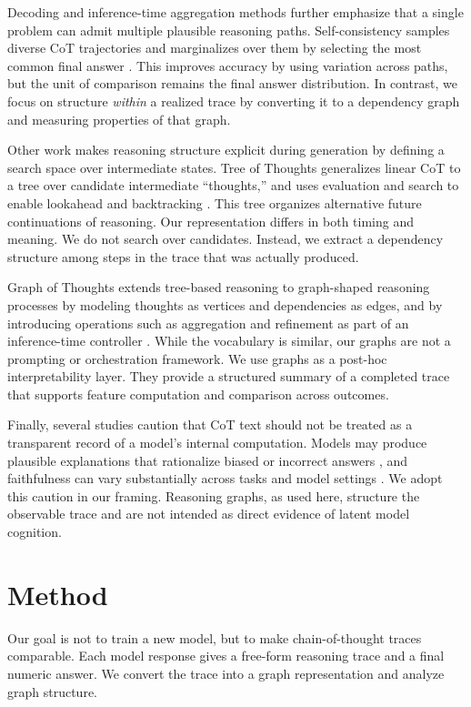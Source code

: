 \documentclass[letterpaper]{article}
\begin{document}
Decoding and inference-time aggregation methods further emphasize that a single problem can admit multiple plausible reasoning paths. Self-consistency samples diverse CoT trajectories and marginalizes over them by selecting the most common final answer \cite{wang2022selfconsistency}. This improves accuracy by using variation across paths, but the unit of comparison remains the final answer distribution. In contrast, we focus on structure \emph{within} a realized trace by converting it to a dependency graph and measuring properties of that graph.

Other work makes reasoning structure explicit during generation by defining a search space over intermediate states. Tree of Thoughts generalizes linear CoT to a tree over candidate intermediate ``thoughts,'' and uses evaluation and search to enable lookahead and backtracking \cite{yao2023tree}. This tree organizes alternative future continuations of reasoning. Our representation differs in both timing and meaning. We do not search over candidates. Instead, we extract a dependency structure among steps in the trace that was actually produced.

Graph of Thoughts extends tree-based reasoning to graph-shaped reasoning processes by modeling thoughts as vertices and dependencies as edges, and by introducing operations such as aggregation and refinement as part of an inference-time controller \cite{besta2024graph}. While the vocabulary is similar, our graphs are not a prompting or orchestration framework. We use graphs as a post-hoc interpretability layer. They provide a structured summary of a completed trace that supports feature computation and comparison across outcomes.

Finally, several studies caution that CoT text should not be treated as a transparent record of a model's internal computation. Models may produce plausible explanations that rationalize biased or incorrect answers \cite{turpin2023unfaithful}, and faithfulness can vary substantially across tasks and model settings \cite{lanham2023faithfulness}. We adopt this caution in our framing. Reasoning graphs, as used here, structure the observable trace and are not intended as direct evidence of latent model cognition.


\section{Method}

Our goal is not to train a new model, but to make chain-of-thought traces comparable. Each model response gives a free-form reasoning trace and a final numeric answer. We convert the trace into a graph representation and analyze graph structure.
\end{document}
